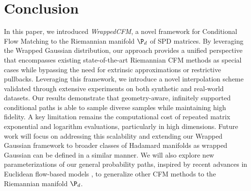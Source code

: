\documentclass[10pt]{article} %
\theoremstyle{plain}
\theoremstyle{definition}
\theoremstyle{remark}
\begin{document}
\section{Conclusion}
In this paper, we introduced \emph{WrappedCFM}, a novel framework for Conditional Flow Matching to the Riemannian manifold $\P_d$ of SPD matrices. By leveraging the Wrapped Gaussian distribution, our approach provides a unified perspective that encompasses existing state-of-the-art Riemannian CFM methods as special cases while bypassing the need for extrinsic approximations or restrictive pullbacks. Leveraging this framework, we introduce a novel interpolation scheme validated through extensive experiments on both synthetic and real-world datasets. Our results demonstrate that geometry-aware, infinitely supported conditional paths is able to sample diverse samples while maintaining high fidelity. A key limitation remains the computational cost of repeated matrix exponential and logarithm evaluations, particularly in high dimensions. Future work will focus on addressing this scalability and extending our Wrapped Gaussian framework to broader classes of Hadamard manifolds \cite{shigaHadamardManifolds1984} as wrapped Gaussian can be defined in a similar manner. We will also explore new parameterizations of our general probability paths, inspired by recent advances in Euclidean flow-based models \citep{albergo2023stochasticinterpolants,liu2022flow,DBLP:conf/icml/PooladianBDALC23,pmlr-v238-tong24a}, to generalize other CFM methods to the Riemannian manifold $\P_d$.


\end{document}
